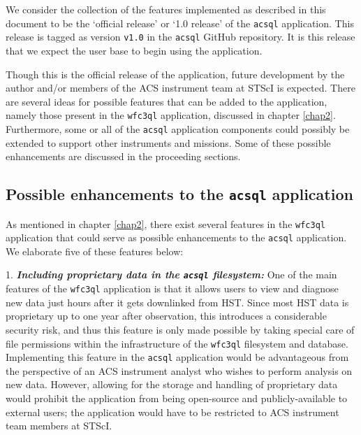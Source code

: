 \documentclass[10pt,journal,compsoc]{IEEEtran}
\begin{document}
We consider the collection of the features implemented as described in this document to be the `official release' or `1.0 release' of the \texttt{acsql} application.  This release is tagged as
version \texttt{v1.0} in the \texttt{acsql} GitHub repository.  It is this release that we expect the user base to begin using the application.

Though this is the official release of the application, future development by the author and/or members of the ACS instrument team at STScI is expected.  There are several ideas for possible
features that can be added to the application, namely those present in the \texttt{wfc3ql} application, discussed in chapter \ref{chap2}.  Furthermore, some or all of the \texttt{acsql} application
components could possibly be extended to support other instruments and missions.  Some of these possible enhancements are discussed in the proceeding sections.


\subsection{Possible enhancements to the \texttt{acsql} application} \label{sec5.1}

As mentioned in chapter \ref{chap2}, there exist several features in the \texttt{wfc3ql} application that could serve as possible enhancements to the \texttt{acsql} application.  We elaborate five of
these features below:

1. \textbf{\textit{Including proprietary data in the \texttt{acsql} filesystem:}}  One of the main features of the \texttt{wfc3ql} application is that it allows users to view and diagnose new data
just hours after it gets downlinked from HST.  Since most HST data is proprietary up to one year after observation, this introduces a considerable security risk, and thus this feature is only made
possible by taking special care of file permissions within the infrastructure of the \texttt{wfc3ql} filesystem and database.  Implementing this feature in the \texttt{acsql} application would be
advantageous from the perspective of an ACS instrument analyst who wishes to perform analysis on new data.  However, allowing for the storage and handling of proprietary data would prohibit the
application from being open-source and publicly-available to external users; the application would have to be restricted to ACS instrument team members at STScI.
\end{document}
